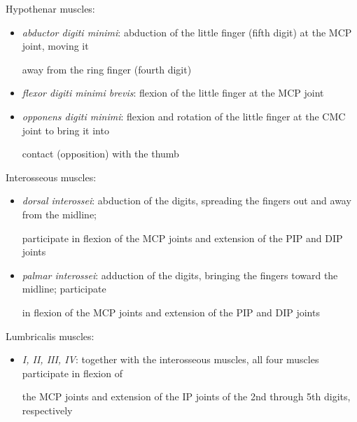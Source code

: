 \documentclass{article}
\begin{document}
Hypothenar muscles:

\begin{itemize}
\item \textit{abductor digiti minimi}: abduction of the little finger (fifth digit) at the MCP joint, moving it

away from the ring finger (fourth digit)


\item \textit{flexor digiti minimi brevis}: flexion of the little finger at the MCP joint


\item \textit{opponens digiti minimi}: flexion and rotation of the little finger at the CMC joint to bring it into

contact (opposition) with the thumb
\end{itemize}

Interosseous muscles:

\begin{itemize}
\item \textit{dorsal interossei}: abduction of the digits, spreading the fingers out and away from the midline;

participate in flexion of the MCP joints and extension of the PIP and DIP joints


\item \textit{palmar interossei}: adduction of the digits, bringing the fingers toward the midline; participate

in flexion of the MCP joints and extension of the PIP and DIP joints
\end{itemize}

Lumbricalis muscles:

\begin{itemize}
\item \textit{I, II, III, IV}: together with the interosseous muscles, all four muscles participate in flexion of

the MCP joints and extension of the IP joints of the 2nd through 5th digits, respectively
\end{itemize}
\end{document}
